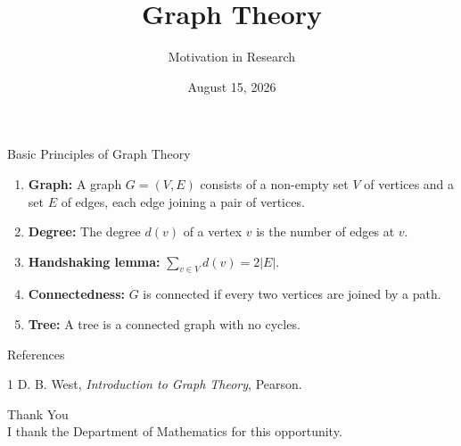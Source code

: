 \documentclass{beamer}
\title{Graph Theory}
\subtitle{Motivation in Research}
\author{}
\institute{Mumbai University}
\date{August 15, 2026}
\begin{document}
	
	\begin{frame}\titlepage\end{frame}
	
	\begin{frame}{Basic Principles of Graph Theory}
		\begin{enumerate}
			\item \textbf{Graph:} A graph $G=(V,E)$ consists of a non-empty set $V$ of vertices and a set $E$ of edges, each edge joining a pair of vertices.
			\item \textbf{Degree:} The degree $d(v)$ of a vertex $v$ is the number of edges at $v$.
			\item \textbf{Handshaking lemma:} $\displaystyle\sum_{v\in V}d(v)=2|E|$.
			\item \textbf{Connectedness:} $G$ is connected if every two vertices are joined by a path.
			\item \textbf{Tree:} A tree is a connected graph with no cycles.
		\end{enumerate}
	\end{frame}
	
	\begin{frame}{References}
		\begin{thebibliography}{1}
			 D. B. West, \emph{Introduction to Graph Theory}, Pearson.
		\end{thebibliography}
	\end{frame}
	
	\begin{frame}
		\centering
		{\Huge Thank You}\\[5mm]
		I thank the Department of Mathematics for this opportunity.
	\end{frame}
	
\end{document}
